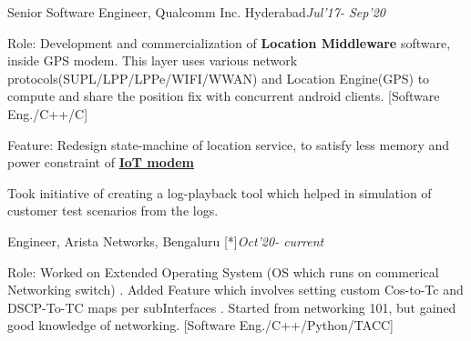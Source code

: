 \documentclass{resume}
\begin{document}
 
\begin{rSection}{}
\begin{rSubsection}{Senior Software Engineer, Qualcomm Inc. Hyderabad}{\emph{Jul'17- Sep'20}}{}{} 
\item Role: Development and commercialization of \textbf{Location Middleware }software, inside GPS modem. This layer uses various network protocols(SUPL/LPP/LPPe/WIFI/WWAN) and Location Engine(GPS) to compute and share the position fix with concurrent android clients. [Software Eng./C++/C]
\\
\item Feature: Redesign state-machine of location service, to satisfy less memory and power constraint of {\href{https://www.qualcomm.com/products/qualcomm-9205-lte-modem}{\textbf{IoT modem}}}

\item Took initiative of creating a log-playback tool which helped in simulation of customer test scenarios from the logs. 
\end{rSubsection} 
\begin{rSubsection}{Engineer, Arista Networks, Bengaluru [*]}{\emph{Oct'20- current}}{}{} 
\item Role: Worked on Extended Operating System (OS which runs on commerical Networking switch) . Added Feature which involves setting custom Cos-to-Tc and DSCP-To-TC maps per subInterfaces . Started from networking 101, but gained good knowledge of networking.  [Software Eng./C++/Python/TACC]
\end{rSubsection} 
\end{rSection} 
\end{document}
